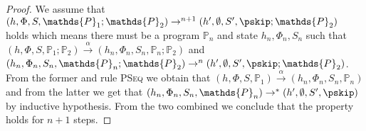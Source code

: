 \begin{lem}
{\begin{proof}
	We assume that $(h, \Phi, S, \mathds{P}_1; \mathds{P}_2) \rightarrow^{n+1} (h', \emptyset, S', \pskip; \mathds{P}_2)$ holds which means there must be a program $\mathds{P}_n$ and state $h_n, \Phi_n, S_n$ such that $(h, \Phi, S, \mathds{P}_1; \mathds{P}_2) \xrightarrow{\alpha} (h_n, \Phi_n, S_n, \mathds{P}_n; \mathds{P}_2)$ and $(h_n, \Phi_n, S_n, \mathds{P}_n; \mathds{P}_2) \rightarrow^{n} (h', \emptyset, S', \pskip ; \mathds{P}_2)$. From the former and rule \textsc{PSeq} we obtain that $(h, \Phi, S, \mathds{P}_1) \xrightarrow{\alpha} (h_n, \Phi_n, S_n, \mathds{P}_n)$ and from the latter we get that $(h_n, \Phi_n, S_n, \mathds{P}_n) \rightarrow^* (h', \emptyset, S', \pskip)$ by inductive hypothesis. From the two combined we conclude that the property holds for $n + 1$ steps.
	\end{proof}
	}
\end{lem}

